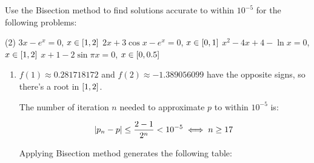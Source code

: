\documentclass[../../../../Assignments.tex]{subfiles}
\begin{document}
\begin{exercise}
    Use the Bisection method to find solutions accurate to within \(10^{-5}\)
    for the following problems:

    \begin{tasks}(2)
        \task \(3x - e^x = 0\), \(x \in \interval{1}{2}\)
        \task \(2x + 3 \cos{x} -e^x = 0\), \(x \in \interval{0}{1}\)
        \task \(x^2 - 4x + 4 - \ln{x} = 0\), \(x \in \interval{1}{2}\)
        \task \(x + 1 - 2 \sin{\pi x} = 0\), \(x \in \interval{0}{\num{0.5}}\)
    \end{tasks}
\end{exercise}

\begin{solution}
    \begin{enumerate}[label = (\alph*)]
        \item \(f(1) \approx \num{0.281718172}\) and \(f(2) \approx
            \num{-1.389056099}\) have the opposite signs, so there's a root in
            \(\interval{1}{2}\).

            The number of iteration \(n\) needed to approximate \(p\) to within
            \(10^{-5}\) is:

            \[\abs{p_n - p} \leq \frac{2 - 1}{2^n} < 10^{-5} \iff n \geq 17\]

            Applying Bisection method generates the following table:


\end{enumerate}
\end{solution}
\end{document}
